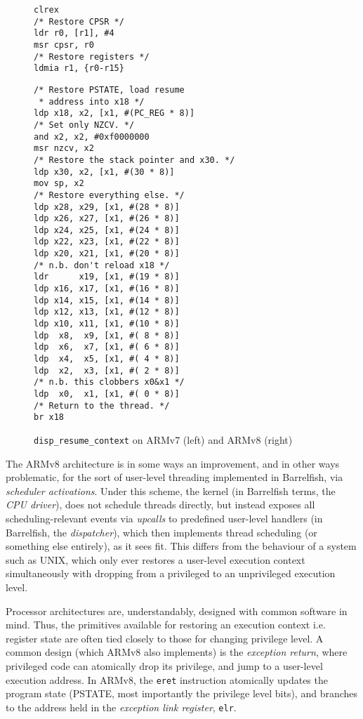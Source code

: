 \documentclass[a4paper,twoside]{report}
\begin{document}
\begin{figure}[htb]
\begin{center}
\begin{minipage}[t]{0.3\textwidth}
\begin{lstlisting}
clrex
/* Restore CPSR */
ldr r0, [r1], #4
msr cpsr, r0
/* Restore registers */
ldmia r1, {r0-r15}
\end{lstlisting}
\end{minipage}
\hspace{2cm}
\begin{minipage}[t]{0.5\textwidth}
\begin{lstlisting}
/* Restore PSTATE, load resume
 * address into x18 */
ldp x18, x2, [x1, #(PC_REG * 8)]
/* Set only NZCV. */
and x2, x2, #0xf0000000
msr nzcv, x2
/* Restore the stack pointer and x30. */
ldp x30, x2, [x1, #(30 * 8)]
mov sp, x2
/* Restore everything else. */
ldp x28, x29, [x1, #(28 * 8)]
ldp x26, x27, [x1, #(26 * 8)]
ldp x24, x25, [x1, #(24 * 8)]
ldp x22, x23, [x1, #(22 * 8)]
ldp x20, x21, [x1, #(20 * 8)]
/* n.b. don't reload x18 */
ldr      x19, [x1, #(19 * 8)]
ldp x16, x17, [x1, #(16 * 8)]
ldp x14, x15, [x1, #(14 * 8)]
ldp x12, x13, [x1, #(12 * 8)]
ldp x10, x11, [x1, #(10 * 8)]
ldp  x8,  x9, [x1, #( 8 * 8)]
ldp  x6,  x7, [x1, #( 6 * 8)]
ldp  x4,  x5, [x1, #( 4 * 8)]
ldp  x2,  x3, [x1, #( 2 * 8)]
/* n.b. this clobbers x0&x1 */
ldp  x0,  x1, [x1, #( 0 * 8)]
/* Return to the thread. */
br x18
\end{lstlisting}
\end{minipage}
\end{center}
\caption{\texttt{disp\_resume\_context} on ARMv7 (left) and ARMv8 (right)}
\label{f:disp_resume}
\end{figure}

The ARMv8 architecture is in some ways an improvement, and in other ways
problematic, for the sort of user-level threading implemented in Barrelfish,
via \emph{scheduler activations}. Under this scheme, the kernel (in Barrelfish
terms, the \emph{CPU driver}), does not schedule threads directly, but instead
exposes all scheduling-relevant events via \emph{upcalls} to predefined
user-level handlers (in Barrelfish, the \emph{dispatcher}), which then
implements thread scheduling (or something else entirely), as it sees fit.
This differs from the behaviour of a system such as UNIX, which only ever
restores a user-level execution context simultaneously with dropping from a
privileged to an unprivileged execution level.

Processor architectures are, understandably, designed with common software in
mind. Thus, the primitives available for restoring an execution context i.e.
register state are often tied closely to those for changing privilege level. A
common design (which ARMv8 also implements) is the \emph{exception return},
where privileged code can atomically drop its privilege, and jump to a
user-level execution address. In ARMv8, the \texttt{eret} instruction
atomically updates the program state (PSTATE, most importantly the privilege
level bits), and branches to the address held in the \emph{exception link
register}, \texttt{elr}.
\end{document}
